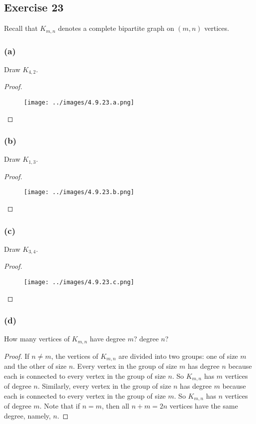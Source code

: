 \documentclass[14pt]{extarticle}
\begin{document}
\subsection{Exercise 23}
Recall that $K_{m,n}$ denotes a complete bipartite graph on $(m, n)$ vertices.

\subsubsection{(a)}
Draw $K_{4,2}$.

\begin{proof}
    \begin{figure}[ht!]
        \centering
        \texttt{[image: ../images/4.9.23.a.png]}
    \end{figure}
\end{proof}

\subsubsection{(b)}
Draw $K_{1,3}$.

\begin{proof}
    \begin{figure}[ht!]
        \centering
        \texttt{[image: ../images/4.9.23.b.png]}
    \end{figure}
\end{proof}

\subsubsection{(c)}
Draw $K_{3,4}$.

\begin{proof}
    \begin{figure}[ht!]
        \centering
        \texttt{[image: ../images/4.9.23.c.png]}
    \end{figure}
\end{proof}

\subsubsection{(d)}
How many vertices of $K_{m,n}$ have degree $m$? degree $n$?

\begin{proof}
    If $n \neq m$, the vertices of $K_{m,n}$ are divided into two groups: one of size $m$ and the other of size $n$. Every vertex in the group of size $m$ has degree $n$ because each is connected to every vertex in the group of size $n$. So $K_{m,n}$ has $m$ vertices of degree $n$. Similarly, every vertex in the group of size $n$ has degree $m$ because each is connected to every vertex in the group of size $m$. So $K_{m,n}$ has $n$ vertices of degree $m$. Note that if $n = m$, then all $n + m = 2n$ vertices have the same degree, namely, $n$.
\end{proof}
\end{document}
